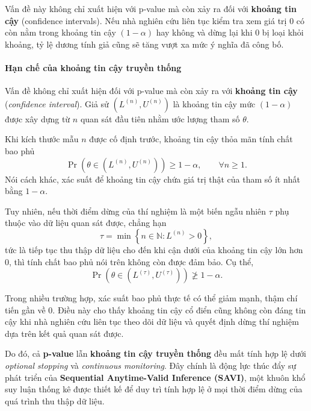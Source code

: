 Vấn đề này không chỉ xuất hiện với p-value mà còn xảy ra đối với \textbf{khoảng tin cậy} (confidence intervals). Nếu nhà nghiên cứu liên tục kiểm tra xem giá trị 0 có còn nằm trong khoảng tin cậy $(1-\alpha)$ hay không và dừng lại khi 0 bị loại khỏi khoảng, tỷ lệ dương tính giả cũng sẽ tăng vượt xa mức ý nghĩa đã công bố.

\paragraph{Hạn chế của khoảng tin cậy truyền thống}

Vấn đề không chỉ xuất hiện đối với p-value mà còn xảy ra với
\textbf{khoảng tin cậy} (\textit{confidence interval}).
Giả sử $(L^{(n)},U^{(n)})$ là khoảng tin cậy mức $(1-\alpha)$
được xây dựng từ $n$ quan sát đầu tiên nhằm ước lượng tham số $\theta$.

Khi kích thước mẫu $n$ được cố định trước, khoảng tin cậy thỏa mãn tính chất bao phủ
\begin{equation}
\Pr\!\left(
\theta \in \left(L^{(n)},U^{(n)}\right)
\right)
\geq 1-\alpha,
\qquad \forall n\geq 1.
\end{equation}
Nói cách khác, xác suất để khoảng tin cậy chứa giá trị thật của tham số
ít nhất bằng $1-\alpha$.

Tuy nhiên, nếu thời điểm dừng của thí nghiệm là một biến ngẫu nhiên $\tau$
phụ thuộc vào dữ liệu quan sát được, chẳng hạn
\begin{equation}
\tau
=
\min
\left\{
n\in\mathbb{N}:L^{(n)}>0
\right\},
\end{equation}
tức là tiếp tục thu thập dữ liệu cho đến khi cận dưới của khoảng tin cậy
lớn hơn 0, thì tính chất bao phủ nói trên không còn được đảm bảo. Cụ thể,
\begin{equation}
\Pr\!\left(
\theta \in \left(L^{(\tau)},U^{(\tau)}\right)
\right)
\ngeq 1-\alpha.
\end{equation}

Trong nhiều trường hợp, xác suất bao phủ thực tế có thể giảm mạnh,
thậm chí tiến gần về 0. Điều này cho thấy khoảng tin cậy cổ điển cũng
không còn đáng tin cậy khi nhà nghiên cứu liên tục theo dõi dữ liệu và
quyết định dừng thí nghiệm dựa trên kết quả quan sát được.

Do đó, cả \textbf{p-value} lẫn \textbf{khoảng tin cậy truyền thống}
đều mất tính hợp lệ dưới \textit{optional stopping} và
\textit{continuous monitoring}. Đây chính là động lực thúc đẩy sự phát triển của
\textbf{Sequential Anytime-Valid Inference (SAVI)},
một khuôn khổ suy luận thống kê được thiết kế để duy trì tính hợp lệ
ở mọi thời điểm dừng của quá trình thu thập dữ liệu.

